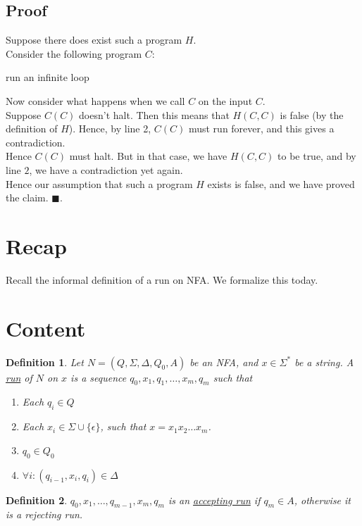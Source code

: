 \documentclass[a4paper]{article}
\newtheorem{defn}{Definition}
\newcommand{\nl}{\vspace{0.2cm}\\}
\begin{document}
\subsection{Proof}
Suppose there does exist such a program $H$.\nl
Consider the following program $C$:
\begin{algorithmic}[1]
            \State run an infinite loop
        \Else
            \State \Return
        \EndIf
    \EndFunction
\end{algorithmic}
Now consider what happens when we call $C$ on the input $C$.\nl
Suppose $C(C)$ doesn't halt. Then this means that $H(C, C)$ is false (by the definition of $H$).
Hence, by line 2, $C(C)$ must run forever, and this gives a contradiction.\nl
Hence $C(C)$ must halt. But in that case, we have $H(C, C)$ to be true, and by line $2$, we have a contradiction yet again.\nl
Hence our assumption that such a program $H$ exists is false, and we have proved the claim. $\blacksquare$.

\fi



\section{Recap}

Recall the informal definition of a run on NFA. We formalize this today.

\section{Content}

\begin{defn}
    Let $N = (Q, \Sigma, \Delta, Q_0, A)$ be an NFA, and $x \in \Sigma^*$ be a string. A \underline{run} of $N$ on $x$ is a sequence $q_0, x_1, q_1, \ldots, x_m, q_m$ such that
    \begin{enumerate}
        \item Each $q_i \in Q$
        \item Each $x_i \in \Sigma \cup \{\epsilon\}$, such that $x = x_1x_2 \ldots x_m$.
        \item $q_0 \in Q_0$
        \item $\forall i : (q_{i - 1}, x_i, q_i) \in \Delta$
    \end{enumerate}
\end{defn}

\begin{defn}
    $q_0, x_1, \ldots, q_{m - 1}, x_m, q_m$ is an \underline{accepting run} if $q_m \in A$, otherwise it is a rejecting run.
\end{defn}
\end{document}
